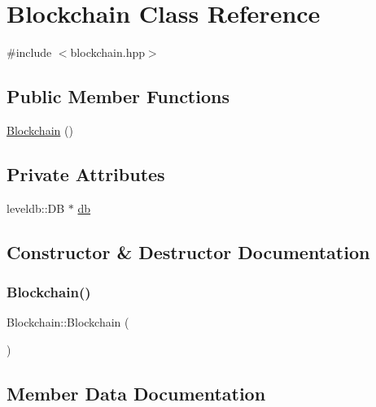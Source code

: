 \hypertarget{classBlockchain}{}\section{Blockchain Class Reference}
\label{classBlockchain}


{\ttfamily \#include $<$blockchain.\+hpp$>$}

\subsection*{Public Member Functions}
\begin{DoxyCompactItemize}
\item 
\mbox{\hyperlink{classBlockchain_afb66c736ee870ebf75913d01a50f87a4}{Blockchain}} ()
\end{DoxyCompactItemize}
\subsection*{Private Attributes}
\begin{DoxyCompactItemize}
\item 
leveldb\+::\+DB $\ast$ \mbox{\hyperlink{classBlockchain_a97704cc18273d09f4add0ffc91e90df3}{db}}
\end{DoxyCompactItemize}


\subsection{Constructor \& Destructor Documentation}
\mbox{\label{classBlockchain_afb66c736ee870ebf75913d01a50f87a4}} 
\subsubsection{\texorpdfstring{Blockchain()}{Blockchain()}}
{\footnotesize\ttfamily Blockchain\+::\+Blockchain (\begin{DoxyParamCaption}{ }\end{DoxyParamCaption})}



\subsection{Member Data Documentation}
\mbox{\label{classBlockchain_a97704cc18273d09f4add0ffc91e90df3}} 
